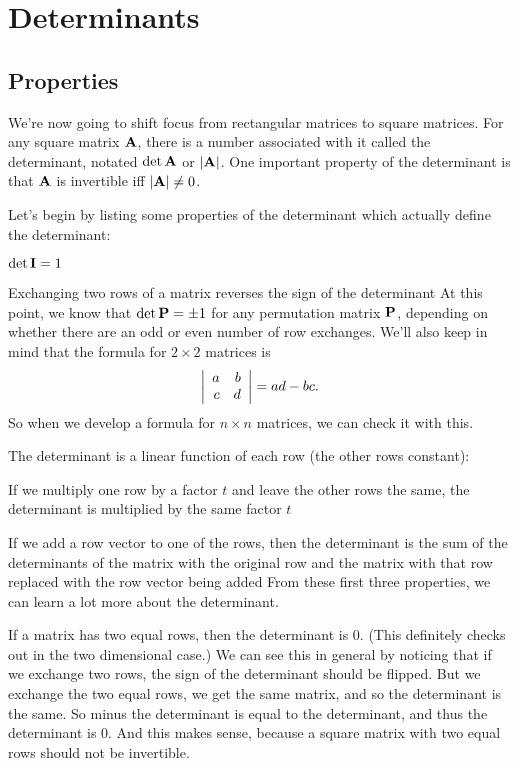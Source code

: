 \section{Determinants}

\subsection{Properties}

We're now going to shift focus from rectangular matrices to square matrices. For any square matrix $\boldsymbol{\mathbf{A}}$, there is a number associated with it called the determinant, notated $\mathrm{det}\, \boldsymbol{\mathbf{A}}$ or $|\boldsymbol{\mathbf{A}}|$. One important property of the determinant is that $\boldsymbol{\mathbf{A}}$ is invertible iff $|\boldsymbol{\mathbf{A}}|\ne 0$. 

Let's begin by listing some properties of the determinant which actually define the determinant:
\bit
\item $\mathrm{det}\, \boldsymbol{\mathbf{I}} = 1$ 
\item Exchanging two rows of a matrix reverses the sign of the determinant
\brm 
At this point, we know that $\mathrm{det}\, \boldsymbol{\mathbf{P}} = \pm 1$ for any permutation matrix $\boldsymbol{\mathbf{P}}$, depending on whether there are an odd or even number of row exchanges. We'll also keep in mind that the formula for $2\times 2$ matrices is 
\[ \left| \begin{array}{rrrrrrrrrrrrrrrrrrrrrrrrr} a&b\\c&d\\ \end{array} \right| = ad-bc. \]
So when we develop a formula for $n \times n$ matrices, we can check it with this.
\erm
\item The determinant is a linear function of each row (the other rows constant):
\bit
\item If we multiply one row by a factor $t$ and leave the other rows the same, the determinant is multiplied by the same factor $t$ 
\item If we add a row vector to one of the rows, then the determinant is the sum of the determinants of the matrix with the original row and the matrix with that row replaced with the row vector being added
\eit
\brm
From these first three properties, we can learn a lot more about the determinant. 
\erm
\item If a matrix has two equal rows, then the determinant is 0. (This definitely checks out in the two dimensional case.) We can see this in general by noticing that if we exchange two rows, the sign of the determinant should be flipped. But we exchange the two equal rows, we get the same matrix, and so the determinant is the same. So minus the determinant is equal to the determinant, and thus the determinant is 0. And this makes sense, because a square matrix with two equal rows should not be invertible. 
